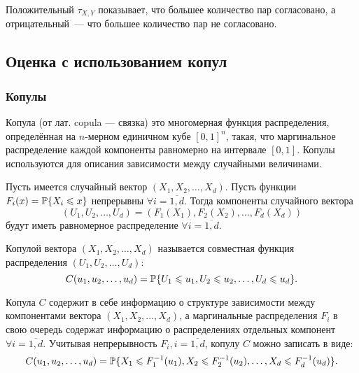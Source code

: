 Положительный $\tau_{X, Y}$ показывает, что большее количество пар согласовано, а отрицательный~--- что большее количество пар не согласовано.

\subsection*{Оценка с использованием копул}

\subsubsection*{Копулы}
Копула (от лат. copula --- связка) это многомерная функция распределения, определённая на $n$-мерном единичном кубе $[0, 1]^n$, такая, что маргинальное распределение каждой компоненты равномерно на интервале $[0, 1]$. Копулы используются для описания зависимости между случайными величинами.

\begin{define}
Пусть имеется случайный вектор $(X_1, X_2, \ldots, X_d)$. Пусть функции $F_i(x) = \P\{X_i \leq x\}$ непрерывны $\forall i = \overline{1, d}$. Тогда компоненты случайного вектора
\begin{equation}
(U_1, U_2, \ldots, U_d)= (F_1(X_1),F_2(X_2), \ldots, F_d(X_d))
\end{equation}
будут иметь равномерное распределение $\forall i = \overline{1, d}$.

Копулой вектора $(X_1, X_2, \ldots, X_d)$ называется совместная функция распределения $(U_1, U_2, \ldots, U_d)$:
\begin{equation}
C(u_1, u_2, \ldots, u_d)=\P\{U_1 \leq u_1, U_2 \leq u_2, \dots, U_d \leq u_d\}.
\end{equation}
\end{define}
Копула $C$ содержит в себе информацию о структуре зависимости между компонентами вектора $(X_1, X_2, \ldots, X_d)$, а маргинальные распределения $F_i$ в свою очередь содержат информацию о распределениях отдельных компонент $\forall i = \overline{1, d}$. Учитывая непрерывность $F_i, i = \overline{1, d}$, копулу $C$ можно записать в виде:
\begin{equation}
C(u_1, u_2, \ldots, u_d)=\P\{X_1 \leq F_1^{-1}(u_1), X_2 \leq F_2^{-1}(u_2), \ldots, X_d \leq F_d^{-1}(u_d)\}.
\end{equation}

